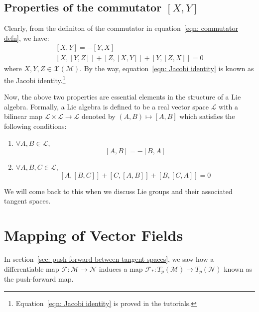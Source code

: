     \subsection{Properties of the commutator $[X,Y]$}
      Clearly, from the definiton of the commutator in equation~\ref{eqn:
      commutator defn}, we have:
      \begin{subequations}
        \begin{gather}
          [X,Y] = -[Y,X] \\
          [X,[Y,Z]] + [Z,[X,Y]] + [Y,[Z,X]] = 0 \label{eqn: Jacobi identity}
        \end{gather}
      \end{subequations}
      where $X,Y,Z \in \mathcal{X}(\mathcal{M})$. By the way,
      equation~\ref{eqn: Jacobi identity} is known as the Jacobi
      identity.\footnote{Equation~\ref{eqn: Jacobi identity} is proved in
      the tutorials.}

      Now, the above two properties are essential elements in the structure
      of a Lie algebra. Formally, a Lie algebra is defined to be a real
      vector space $\mathcal{L}$ with a bilinear map $\mathcal{L} \times
      \mathcal{L} \rightarrow \mathcal{L}$ denoted by $(A,B) \mapsto [A,B]$
      which satisfies the following conditions:
      \begin{enumerate}
        \item{$\forall A,B \in \mathcal{L}$, \[[A,B] = - [B,A]\]}
        \item{$\forall A,B,C \in \mathcal{L}$, \[[A,[B,C]] +[C,[A,B]] +
        [B,[C,A]] = 0\]}
      \end{enumerate}
      We will come back to this when we discuss Lie groups and their associated tangent spaces.
  \section{Mapping of Vector Fields}
    \label{sec: mapping of vector fields}
    In section~\ref{sec: push forward between tangent spaces}, we
    saw how a differentiable map $\mathcal{F}: \mathcal{M} \rightarrow
    \mathcal{N}$ induces a map $\mathcal{F}_{*}:T_p(\mathcal{M})
    \rightarrow T_p(\mathcal{N})$ known as the push-forward map.
